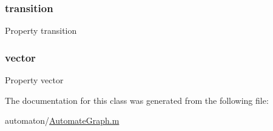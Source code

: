 \subsubsection{\texorpdfstring{transition}{transition}}
{\footnotesize\ttfamily Property transition}

\mbox{\label{class_automate_graph_a5072c909ca262b35ea71867b7b52a01b}} 
\subsubsection{\texorpdfstring{vector}{vector}}
{\footnotesize\ttfamily Property vector}



The documentation for this class was generated from the following file\+:\begin{DoxyCompactItemize}
\item 
automaton/\hyperlink{_automate_graph_8m}{Automate\+Graph.\+m}\end{DoxyCompactItemize}

